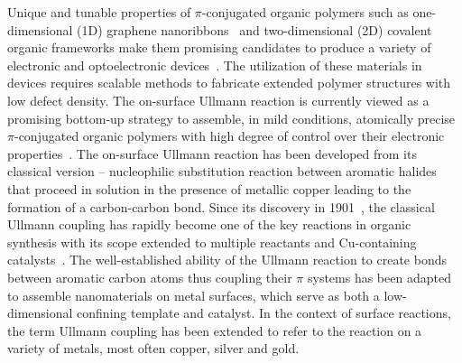 \documentclass[%
 reprint,
 amsmath,amssymb,
 aps,
prb,
floatfix,
]{revtex4-2}
\newcommand{\lock}{\color{red}}
\newcommand{\lock}{\color{red}}
\newcommand{\comm}{\color{Purple}} %
\begin{document}
{\lock


Unique and tunable properties of $\pi$-conjugated organic polymers such as one-dimensional (1D) graphene nanoribbons~\cite{ullmann_106, ullmann_45, ullmann_107, ullmann_101}
and two-dimensional (2D) covalent organic frameworks 
make them promising candidates to produce a variety of electronic and optoelectronic devices~\cite{ullmann_113, ullmann_114}.
%
The utilization of these materials in devices requires scalable methods to fabricate extended polymer structures with low defect density.
%
The on-surface Ullmann reaction is currently viewed as a promising bottom-up strategy to assemble, in mild conditions, atomically precise $\pi$-conjugated organic polymers with high degree of control over their electronic properties~\cite{ullmann_33}. 
%
%
The on-surface Ullmann reaction has been developed from its classical version -- nucleophilic substitution reaction between aromatic halides that proceed in solution in the presence of metallic copper leading to the formation of a carbon-carbon bond. 
Since its discovery in 1901~\cite{ullmann_01}, the classical Ullmann coupling has rapidly become one of the key reactions in organic synthesis with its scope extended to multiple reactants and Cu-containing catalysts~\cite{ullmann_29,ullmann_30,ullmann_31,ullmann_32, ullmann_115, ullmann_116, ullmann_117, ullmann_118, ullmann_119, ullmann_120, ullmann_121, ullmann_122}.
The well-established ability of the Ullmann reaction to create bonds between aromatic carbon atoms thus coupling their $\pi$ systems has been adapted to assemble nanomaterials on metal surfaces, which serve as both a low-dimensional confining template and catalyst.
In the context of surface reactions, the term Ullmann coupling has been extended to refer to the reaction on a variety of metals, most often copper, silver and gold.

}
\end{document}
